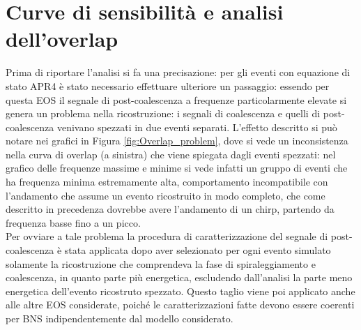 \section{Curve di sensibilità e analisi dell'overlap}
\label{section:overlap}
Prima di riportare l'analisi si fa una precisazione: per gli eventi con equazione di stato APR4 è stato necessario effettuare ulteriore un passaggio: essendo per questa EOS il segnale di post-coalescenza a frequenze particolarmente elevate si genera un problema nella ricostruzione: i segnali di coalescenza e quelli di post-coalescenza venivano spezzati in due eventi separati. L'effetto descritto si può notare nei grafici in Figura \ref{fig:Overlap_problem}, dove si vede un inconsistenza nella curva di overlap (a sinistra) che viene spiegata dagli eventi spezzati: nel grafico delle frequenze massime e minime si vede infatti un gruppo di eventi che ha frequenza minima estremamente alta, comportamento incompatibile con l'andamento che assume un evento ricostruito in modo completo, che come descritto in precedenza dovrebbe avere l'andamento di un chirp, partendo da frequenza basse fino a un picco.\\
Per ovviare a tale problema la procedura di caratterizzazione del segnale di post-coalescenza è stata applicata dopo aver selezionato per ogni evento simulato solamente la ricostruzione che comprendeva la fase di spiraleggiamento e coalescenza, in quanto parte più energetica, escludendo dall'analisi la parte meno energetica dell'evento ricostruto spezzato. Questo taglio viene poi applicato anche alle altre EOS considerate, poiché le caratterizzazioni fatte devono essere coerenti per BNS indipendentemente dal modello considerato.
